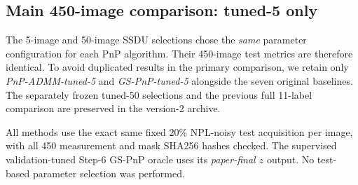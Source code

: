 \documentclass[a4paper,10pt]{article}
\begin{document}
\subsection*{Main 450-image comparison: tuned-5 only}

The 5-image and 50-image SSDU selections chose the \emph{same} parameter
configuration for each PnP algorithm. Their 450-image test metrics are therefore
identical. To avoid duplicated results in the primary comparison, we retain only
\emph{PnP-ADMM-tuned-5} and \emph{GS-PnP-tuned-5} alongside the seven original
baselines. The separately frozen tuned-50 selections and the previous full
11-label comparison are preserved in the version-2 archive.

All methods use the exact same fixed 20\% NPL-noisy test acquisition per
image, with all 450 measurement and mask SHA256 hashes checked. The supervised
validation-tuned Step-6 GS-PnP oracle uses its \emph{paper-final $z$} output.
No test-based parameter selection was performed.

\begin{table}[H]
\centering\scriptsize
{}
\caption{450-image mean $\pm$ sample standard deviation on raw
unclipped reconstructions, for nine retained method labels.}
\label{tab:nine_methods}
\end{table}
\end{document}
